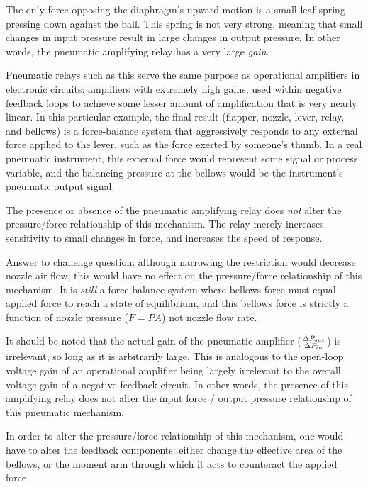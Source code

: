 The only force opposing the diaphragm's upward motion is a small leaf spring pressing down against the ball.  This spring is not very strong, meaning that small changes in input pressure result in large changes in output pressure.  In other words, the pneumatic amplifying relay has a very large {\it gain}.

Pneumatic relays such as this serve the same purpose as operational amplifiers in electronic circuits: amplifiers with extremely high gains, used within negative feedback loops to achieve some lesser amount of amplification that is very nearly linear.  In this particular example, the final result (flapper, nozzle, lever, relay, and bellows) is a force-balance system that aggressively responds to any external force applied to the lever, such as the force exerted by someone's thumb.  In a real pneumatic instrument, this external force would represent some signal or process variable, and the balancing pressure at the bellows would be the instrument's pneumatic output signal.

\vskip 10pt

The presence or absence of the pneumatic amplifying relay does {\it not} alter the pressure/force relationship of this mechanism.  The relay merely increases sensitivity to small changes in force, and increases the speed of response.

\vskip 10pt

Answer to challenge question: although narrowing the restriction would decrease nozzle air flow, this would have no effect on the pressure/force relationship of this mechanism.  It is {\it still} a force-balance system where bellows force must equal applied force to reach a state of equilibrium, and this bellows force is strictly a function of nozzle pressure ($F = PA$) not nozzle flow rate.

\vskip 10pt

It should be noted that the actual gain of the pneumatic amplifier ($\Delta P_{out} \over \Delta P_{in}$) is irrelevant, so long as it is arbitrarily large.  This is analogous to the open-loop voltage gain of an operational amplifier being largely irrelevant to the overall voltage gain of a negative-feedback circuit.  In other words, the presence of this amplifying relay does not alter the input force / output pressure relationship of this pneumatic mechanism.

\vskip 10pt

In order to alter the pressure/force relationship of this mechanism, one would have to alter the feedback components: either change the effective area of the bellows, or the moment arm through which it acts to counteract the applied force.












